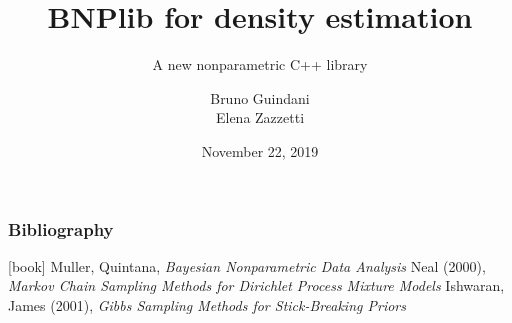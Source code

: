 \documentclass{beamer}
\title[BNPlib]{BNPlib for density estimation}
\subtitle{A new nonparametric C++ library}
\author[Guindani, Zazzetti]{Bruno Guindani \\ Elena Zazzetti}
\institute[PoliMi]{\texttt{[image: ../etc/logo\_long.jpg]}}
\date[2019/11/22]{November 22, 2019}
\begin{document}





\begin{frame} %
	\frametitle{Bibliography}
	\begin{thebibliography}{9}
		 Muller, Quintana, \textit{Bayesian Nonparametric Data Analysis}
		 Neal (2000), \textit{Markov Chain Sampling Methods for Dirichlet Process Mixture Models}
		 Ishwaran, James (2001), \textit{Gibbs Sampling Methods for Stick-Breaking Priors}	
	\end{thebibliography}
\end{frame}
\end{document}

